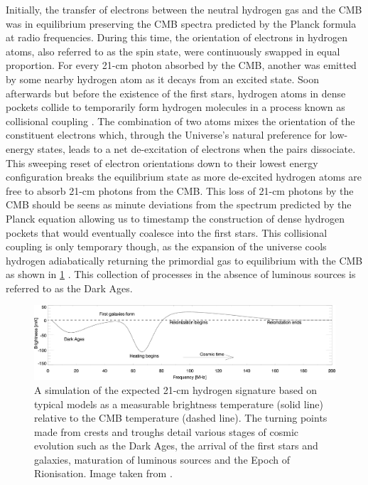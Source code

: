 Initially, the transfer of electrons between the neutral hydrogen gas and the CMB was in equilibrium preserving the CMB spectra predicted by the Planck formula at radio frequencies. During this time, the orientation of electrons in hydrogen atoms, also referred to as the spin state, were continuously swapped in equal proportion. For every 21-cm photon absorbed by the CMB, another was emitted by some nearby hydrogen atom as it decays from an excited state. Soon afterwards but before the existence of the first stars, hydrogen atoms in dense pockets collide to temporarily form hydrogen molecules in a process known as collisional coupling \citep{21in21}. The combination of two atoms mixes the orientation of the constituent electrons which, through the Universe’s natural preference for low-energy states, leads to a net de-excitation of electrons when the pairs dissociate. This sweeping reset of electron orientations down to their lowest energy configuration breaks the equilibrium state as more de-excited hydrogen atoms are free to absorb 21-cm photons from the CMB. This loss of 21-cm photons by the CMB should be seens as minute deviations from the spectrum predicted by the Planck equation allowing us to timestamp the construction of dense hydrogen pockets that would eventually coalesce into the first stars. This collisional coupling is only temporary though, as the expansion of the universe cools hydrogen adiabatically returning the primordial gas to equilibrium with the CMB as shown in \cref{fig:reionisation_hist} \citep{21in21}. This collection of processes in the absence of luminous sources is referred to as the Dark Ages.
\begin{figure}
    \centering
    \includegraphics[width=\textwidth]{21cm_signal}
    \caption{A simulation of the expected 21-cm hydrogen signature based on typical models as a measurable brightness temperature (solid line) relative to the CMB temperature (dashed line). The turning points made from crests and troughs detail various stages of cosmic evolution such as the Dark Ages, the arrival of the first stars and galaxies, maturation of luminous sources and the Epoch of Rionisation. Image taken from \citet{cosmic_signature}.}
    \label{fig:reionisation_hist}
\end{figure}

